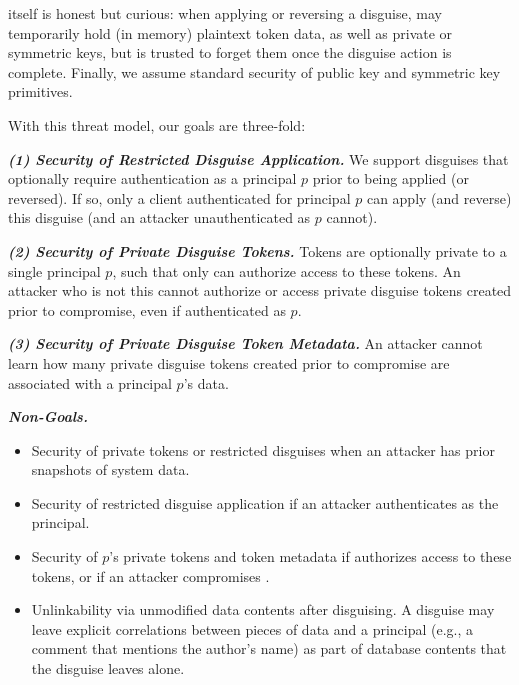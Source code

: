 \sys itself is honest but curious: when applying or reversing a disguise, \sys may temporarily
hold (in memory) plaintext token data, as well as private or symmetric keys, but is trusted to
forget them once the disguise action is complete. 
Finally, we assume standard security of public key and symmetric key primitives.

With this threat model, our goals are three-fold: 

\vspace{6pt}\noindent\textbf{\emph{(1) Security of Restricted Disguise Application.}}
We support disguises that optionally require authentication as a principal $p$ prior to being
applied (or reversed). If so, only a client authenticated for principal $p$ can apply (and reverse) this disguise (and an
attacker unauthenticated as $p$ cannot).

\vspace{6pt}\noindent\textbf{\emph{(2) Security of Private Disguise Tokens.} }
Tokens are optionally private to a single principal $p$, such that only  can authorize
access to these tokens. An attacker who is not this  cannot
authorize or access private disguise tokens created prior to compromise, even if authenticated as $p$.

\vspace{6pt}\noindent\textbf{\emph{(3) Security of Private Disguise Token Metadata.}}
An attacker cannot learn how many private disguise tokens created prior to compromise are associated with a principal $p$'s data.

\vspace{6pt}\noindent\textbf{\emph{Non-Goals.}}
\begin{itemize}
    \item Security of private tokens or restricted disguises when an attacker has prior snapshots of system data.
    \item Security of restricted disguise application if an attacker authenticates as the principal.
    \item Security of $p$'s private tokens and token metadata if  authorizes access to these
        tokens, or if an attacker compromises .
    \item Unlinkability via unmodified data contents after disguising. A disguise may leave explicit correlations
        between pieces of data and a principal (e.g., a comment that mentions the author’s name) as part
        of database contents that the disguise leaves alone.
\end{itemize}

